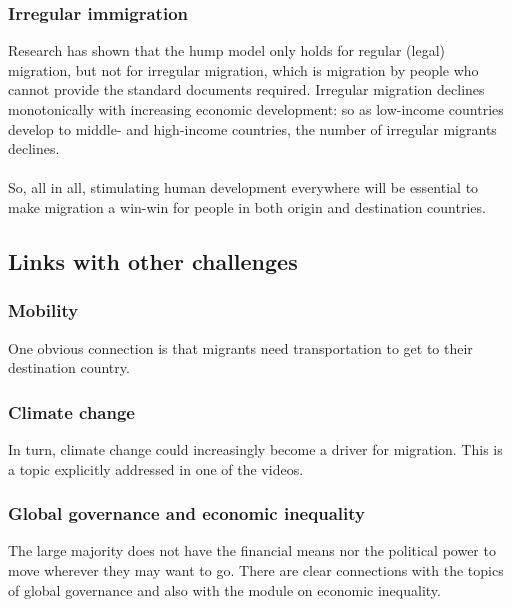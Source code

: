 \documentclass[../summary.tex]{subfiles}
\begin{document}
\subsubsection{Irregular immigration}
Research has shown that the hump model only holds for regular (legal) migration, but not for irregular migration, which is migration by people who cannot provide the standard documents required. Irregular migration declines monotonically with increasing economic development: so as low-income countries develop to middle- and high-income countries, the number of irregular migrants declines.
\\\\
So, all in all, stimulating human development everywhere will be essential to make migration a win-win for people in both origin and destination countries.

\subsection{Links with other challenges}
\subsubsection{Mobility}
One obvious connection is that migrants need transportation to get to their destination country.

\subsubsection{Climate change}
In turn, climate change could increasingly become a driver for migration. This is a topic explicitly addressed in one of the videos.

\subsubsection{Global governance and economic inequality}
The large majority does not have the financial means nor the political power to move wherever they may want to go. There are clear connections with the topics of global governance and also with the module on economic inequality.
\end{document}

